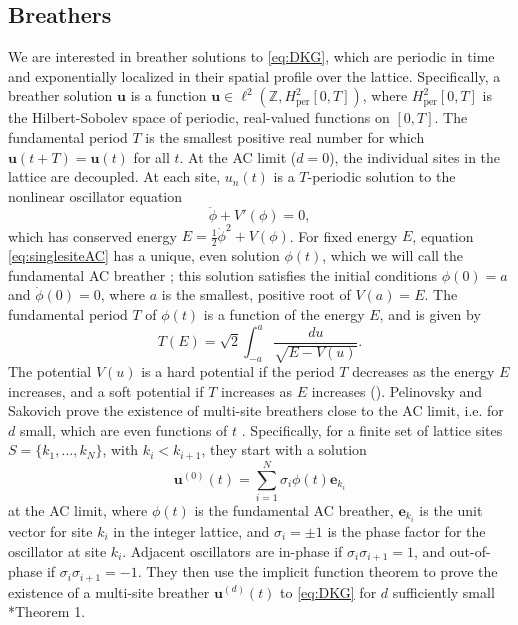 \documentclass[12pt,reqno]{amsart}
\def\Z{{\mathbb Z}}
\def\per{\textrm{per}}
\newcommand{\evec}{\mathbf{e}}
\newcommand{\uvec}{\mathbf{u}}
\theoremstyle{definition}
\begin{document}
\subsection{Breathers}\label{sec:DKGbreather}

We are interested in breather solutions to \cref{eq:DKG}, which are periodic in time and exponentially localized in their spatial
profile over the lattice. Specifically, a breather solution $\uvec$ is a function $\uvec \in \ell^2(\Z, H^2_\per[0,T])$, where $H^2_\per[0,T]$ is the Hilbert-Sobolev space of periodic, real-valued functions on $[0,T]$. 
The fundamental period $T$ is the smallest positive real number for which $\uvec(t+T) = \uvec(t)$ for all $t$. At the AC limit ($d = 0$), the individual sites in the lattice are decoupled. At each site, $u_n(t)$ is a $T$-periodic solution to the nonlinear oscillator equation
\begin{equation}\label{eq:singlesiteAC}
\ddot{\phi} + V'(\phi) = 0,
\end{equation}
which has conserved energy $E = \frac{1}{2}\dot{\phi}^2 + V(\phi)$. For fixed energy $E$, equation \cref{eq:singlesiteAC} has a unique, even solution $\phi(t)$, which we will call the fundamental AC breather \cite{Pelinovsky2012}; this solution satisfies the initial conditions $\phi(0) = a$ and $\dot{\phi}(0) = 0$, where $a$ is the smallest, positive root of $V(a) = E$. The fundamental period $T$ of $\phi(t)$ is a function of the energy $E$, and is given by
\begin{equation}\label{eq:TE}
T(E) = \sqrt{2}\int_{-a}^a \frac{du}{\sqrt{E - V(u)}}.
\end{equation}
The potential $V(u)$ is a hard potential if the period $T$ decreases as the energy $E$ increases, and a soft potential if $T$ increases as $E$ increases (\cites{Pelinovsky2012,cuevas-maraver2016}).
Pelinovsky and Sakovich prove the existence of multi-site breathers close to the AC limit, i.e. for $d$ small, which are even functions of $t$ \cite{Pelinovsky2012}. Specifically, for a finite set of lattice sites $S = \{ k_1, \dots, k_N \}$, with $k_i < k_{i+1}$, they start with a solution
\begin{equation}
\uvec^{(0)}(t) = \sum_{i=1}^N \sigma_i \phi(t) \evec_{k_i}
\end{equation}
at the AC limit, where $\phi(t)$ is the fundamental AC breather, $\evec_{k_i}$ is the unit vector for site $k_i$ in the integer lattice, and $\sigma_i = \pm 1$ is the phase factor for the oscillator at site $k_i$. Adjacent oscillators are in-phase if $\sigma_i \sigma_{i+1} = 1$, and out-of-phase if $\sigma_i \sigma_{i+1} = -1$. They then use the implicit function theorem to prove the existence of a multi-site breather $\uvec^{(d)}(t)$ to \cref{eq:DKG} for $d$ sufficiently small \cite{Pelinovsky2012}*{Theorem 1}. 
\end{document}
